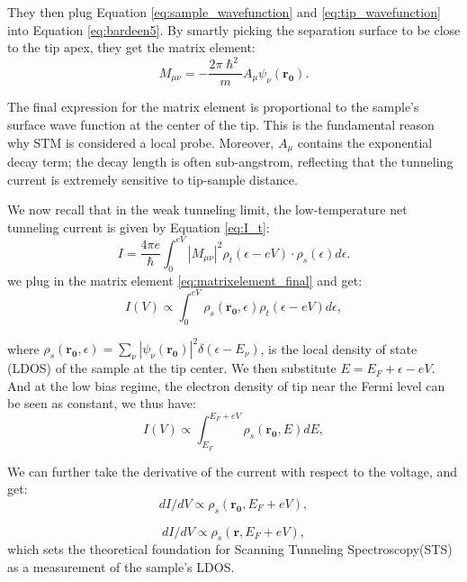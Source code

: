 They then plug Equation \ref{eq:sample_wavefunction} and \ref{eq:tip_wavefunction} into Equation \ref{eq:bardeen5}. By smartly picking the separation surface to be close to the tip apex, they get the matrix element: 
\begin{equation}
	\label{eq:matrixelement_final}
	M_{\mu \nu} = -\frac{2\pi\hslash^2}{m}A_{\mu}\psi_{\nu}(\mathbf{r_0}).
\end{equation}

The final expression for the matrix element is proportional to the sample's surface wave function at the center of the tip. This is the fundamental reason why \ac{STM} is considered a local probe. Moreover, $A_{\mu}$ contains the exponential decay term; the decay length is often sub-angstrom, reflecting that the tunneling current is extremely sensitive to tip-sample distance. 

We now recall that in the weak tunneling limit, the low-temperature net tunneling current is given by Equation \ref{eq:I_t}:
\begin{equation}
	I = \frac{4\pi e}{\hslash} \int_0^{eV}|M_{\mu \nu}|^2 \rho_t(\epsilon - eV) \cdot \rho_s(\epsilon) d\epsilon.
\end{equation}
we plug in the matrix element \ref{eq:matrixelement_final} and get:
\begin{equation}
	I(V) \propto \int_0^{eV}  \rho_s(\mathbf{r_0},\epsilon) \rho_t(\epsilon-eV) d\epsilon,
\end{equation}

where $\rho_s(\mathbf{r_0},\epsilon) = \sum_{\nu} |\psi_{\nu}(\mathbf{r_0})|^2 \delta(\epsilon - E_{\nu})$, is the local density of state (LDOS) of the sample at the tip center. We then substitute $E = E_F+ \epsilon - eV$. And at the low bias regime, the electron density of tip near the Fermi level can be seen as constant, we thus have: 
\begin{equation}
	I(V) \propto \int_{E_F}^{E_F+ eV}  \rho_s(\mathbf{r_0},E) dE,
\end{equation}

We can further take the derivative of the current with respect to the voltage, and get: 
\begin{equation}
	dI/dV \propto \rho_s(\mathbf{r_0},E_F + eV),
\end{equation}

\begin{equation}
	dI/dV \propto \rho_s(\mathbf{r},E_F + eV),
\end{equation}
which sets the theoretical foundation for Scanning Tunneling Spectroscopy(STS) as a measurement of the sample's \ac{LDOS}. 

